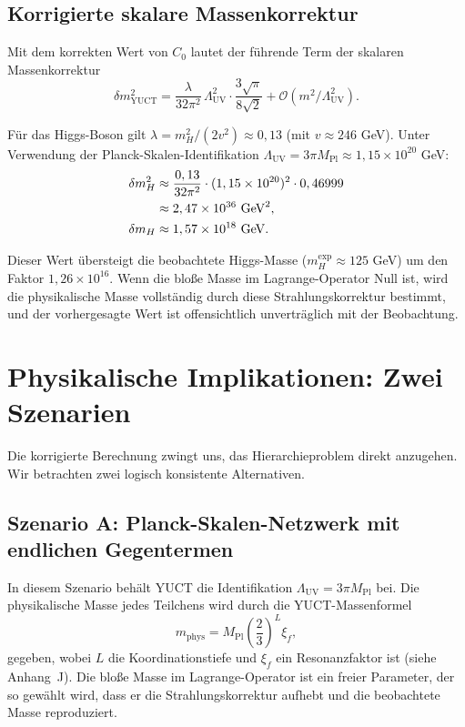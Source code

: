 \documentclass[11pt,a4paper]{article}
\newcommand{\Mpl}{M_{\mathrm{Pl}}}
\newcommand{\LUV}{\Lambda_{\mathrm{UV}}}
\theoremstyle{remark}
\begin{document}
	\subsection{Korrigierte skalare Massenkorrektur}
	
	Mit dem korrekten Wert von \(C_0\) lautet der führende Term der skalaren Massenkorrektur
	\begin{equation}
		\boxed{\delta m^2_{\mathrm{YUCT}} = \frac{\lambda}{32\pi^2}\,\LUV^2 \cdot \frac{3\sqrt{\pi}}{8\sqrt{2}} + \mathcal{O}(m^2/\LUV^2)}.
		\label{eq:scalar_corrected}
	\end{equation}
	
	Für das Higgs-Boson gilt \(\lambda = m_H^2/(2v^2) \approx 0,13\) (mit \(v \approx 246\) GeV). Unter Verwendung der Planck-Skalen-Identifikation \(\LUV = 3\pi\Mpl \approx 1,15\times 10^{20}\) GeV:
	\begin{align}
		\delta m^2_H &\approx \frac{0,13}{32\pi^2} \cdot (1,15\times 10^{20})^2 \cdot 0,46999 \notag\\
		&\approx 2,47 \times 10^{36}\ \mathrm{GeV}^2, \notag\\
		\delta m_H &\approx 1,57 \times 10^{18}\ \mathrm{GeV}.
		\label{eq:planck_correction}
	\end{align}
	
	Dieser Wert übersteigt die beobachtete Higgs-Masse (\(m_H^{\mathrm{exp}} \approx 125\) GeV) um den Faktor \(1,26 \times 10^{16}\). Wenn die bloße Masse im Lagrange-Operator Null ist, wird die physikalische Masse vollständig durch diese Strahlungskorrektur bestimmt, und der vorhergesagte Wert ist offensichtlich unverträglich mit der Beobachtung.
	
	\section{Physikalische Implikationen: Zwei Szenarien}
	\label{sec:scenarios}
	
	Die korrigierte Berechnung zwingt uns, das Hierarchieproblem direkt anzugehen. Wir betrachten zwei logisch konsistente Alternativen.
	
	\subsection{Szenario A: Planck-Skalen-Netzwerk mit endlichen Gegentermen}
	
	In diesem Szenario behält YUCT die Identifikation \(\LUV = 3\pi\Mpl\) bei. Die physikalische Masse jedes Teilchens wird durch die YUCT-Massenformel
	\begin{equation}
		m_{\mathrm{phys}} = \Mpl \left(\frac{2}{3}\right)^L \xi_f,
		\label{eq:mass_formula}
	\end{equation}
	gegeben, wobei \(L\) die Koordinationstiefe und \(\xi_f\) ein Resonanzfaktor ist (siehe Anhang~J). Die bloße Masse im Lagrange-Operator ist ein freier Parameter, der so gewählt wird, dass er die Strahlungskorrektur aufhebt und die beobachtete Masse reproduziert.
	
\end{document}
